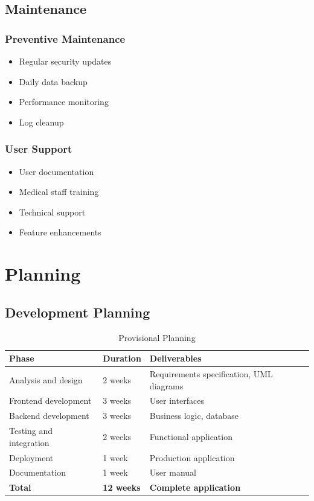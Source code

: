 \documentclass[12pt,a4paper]{report}
\begin{document}
\section{Maintenance}

\subsection{Preventive Maintenance}
\begin{itemize}
    \item Regular security updates
    \item Daily data backup
    \item Performance monitoring
    \item Log cleanup
\end{itemize}

\subsection{User Support}
\begin{itemize}
    \item User documentation
    \item Medical staff training
    \item Technical support
    \item Feature enhancements
\end{itemize}

\chapter{Planning}

\section{Development Planning}

\begin{table}[H]
\centering
\begin{tabular}{|l|l|l|}
\hline
\textbf{Phase} & \textbf{Duration} & \textbf{Deliverables} \\
\hline
Analysis and design & 2 weeks & Requirements specification, UML diagrams \\
\hline
Frontend development & 3 weeks & User interfaces \\
\hline
Backend development & 3 weeks & Business logic, database \\
\hline
Testing and integration & 2 weeks & Functional application \\
\hline
Deployment & 1 week & Production application \\
\hline
Documentation & 1 week & User manual \\
\hline
\textbf{Total} & \textbf{12 weeks} & \textbf{Complete application} \\
\hline
\end{tabular}
\caption{Provisional Planning}
\end{table}
\end{document}
